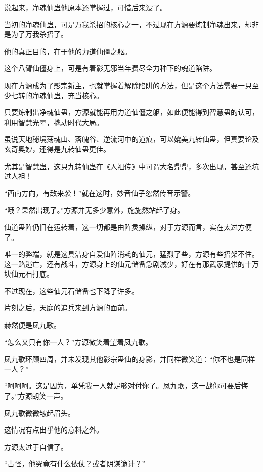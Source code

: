 \begin{this_body}
说起来，净魂仙蛊他原本还掌握过，可惜后来没了。

当初的净魂仙蛊，可是万我杀招的核心之一，不过现在方源要炼制净魂出来，却非是为了万我杀招了。

他的真正目的，在于他的力道仙僵之躯。

这个八臂仙僵身上，可是有着影无邪当年费尽全力种下的魂道陷阱。

现在方源成为了影宗新主，也就掌握着解除陷阱的方法，但是这个方法需要一只至少七转的净魂仙蛊，充当核心。

只要炼制出净魂仙蛊，方源就能再用力道仙僵之躯，如此便能得到智慧蛊的认可，利用智慧光晕，撬动时代大局。

虽说天地秘境荡魂山、落魄谷、逆流河中的道痕，可以媲美九转仙蛊，但真要论及玄奇奥妙，还得是九转仙蛊更佳。

尤其是智慧蛊，这只九转仙蛊在《人祖传》中可谓大名鼎鼎，多次出现，甚至还坑过人祖！

“西南方向，有敌来袭！”就在这时，妙音仙子忽然传音示警。

“哦？果然出现了。”方源并无多少意外，施施然站起了身。

仙道蛊阵仍旧在运转着，这一切都是由阵灵操纵，对于方源而言，实在太过方便了。

唯一的弊端，就是这具洁身自爱仙阵消耗的仙元，猛烈了些，方源有些招架不住。这一路逃亡，还有战斗，方源身上的仙元储备急剧减少，好在有那武家提供的十万块仙元石打底。

不过现在，这些仙元石储备也下降了许多。

片刻之后，天庭的追兵来到方源的面前。

赫然便是凤九歌。

“怎么又只有你一人？”方源微笑着望着凤九歌。

凤九歌环顾四周，并未发现其他影宗蛊仙的身影，并同样微笑道：“你不也是同样一人？”

“呵呵呵。这是因为，单凭我一人就足够对付你了。凤九歌，这一战你可要后悔了。”方源朗笑一声。

凤九歌微微皱起眉头。

这情况有点出乎他的意料之外。

方源太过于自信了。

“古怪，他究竟有什么依仗？或者阴谋诡计？”

\end{this_body}

